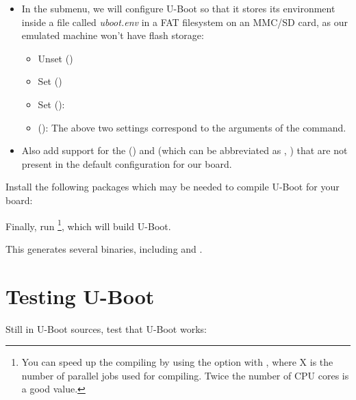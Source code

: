 \begin{itemize}
\item In the  submenu, we will configure U-Boot so
    that it stores its environment inside a file called {\em
    uboot.env} in a FAT filesystem on an MMC/SD card, as our emulated
    machine won't have flash storage:
    \begin{itemize}
    \item Unset  ()
    \item Set  ()
    \item Set  (): 
    \item {} (): \newline
        The above two settings correspond to the arguments of the
         command.
    \end{itemize}
\item Also add support for the  ()
    and  (which can be abbreviated as , )
    that are not present in the default configuration for our board.
\end{itemize}

Install the following packages which may be needed to compile U-Boot for
your board:


Finally, run \footnote{You can speed up the
compiling by using the  option with , where X
is the number of parallel jobs used for compiling. Twice the
number of CPU cores is a good value.}, which will build U-Boot.

This generates several binaries, including  and
.

\section{Testing U-Boot}

Still in U-Boot sources, test that U-Boot works:


